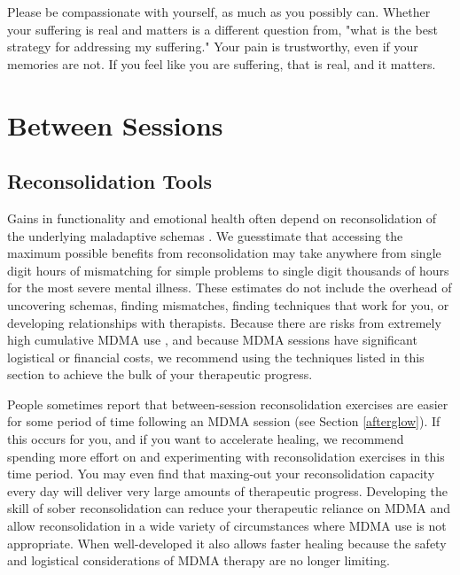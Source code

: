 \documentclass[12pt,letterpaper]{book}
\begin{document}
Please be compassionate with yourself, as much as you possibly can. Whether your suffering is real and matters is a different question from, "what is the best strategy for addressing my suffering." Your pain is trustworthy, even if your memories are not. If you feel like you are suffering, that is real, and it matters.
\chapter{Between Sessions}
\section{Reconsolidation Tools}
\label{sec:moreReconsolidation}
Gains in functionality and emotional health often depend on reconsolidation of the underlying maladaptive schemas \cite{eckerUnlocking}. We guesstimate that accessing the maximum possible benefits from reconsolidation may take anywhere from single digit hours of mismatching for simple problems to single digit thousands of hours for the most severe mental illness. These estimates do not include the overhead of uncovering schemas, finding mismatches, finding techniques that work for you, or developing relationships with therapists. Because there are risks from extremely high cumulative MDMA use \cite{tagen2023valvular}, and because MDMA sessions have significant logistical or financial costs, we recommend using the techniques listed in this section to achieve the bulk of your therapeutic progress.

People sometimes report that between-session reconsolidation exercises are easier for some period of time following an MDMA session (see Section \ref{afterglow}). If this occurs for you, and if you want to accelerate healing, we recommend spending more effort on and experimenting with reconsolidation exercises in this time period. You may even find that maxing-out your reconsolidation capacity every day will deliver very large amounts of therapeutic progress. Developing the skill of sober reconsolidation can reduce your therapeutic reliance on MDMA and allow reconsolidation in a wide variety of circumstances where MDMA use is not appropriate. When well-developed it also allows faster healing because the safety and logistical considerations of MDMA therapy are no longer limiting.
\end{document}
